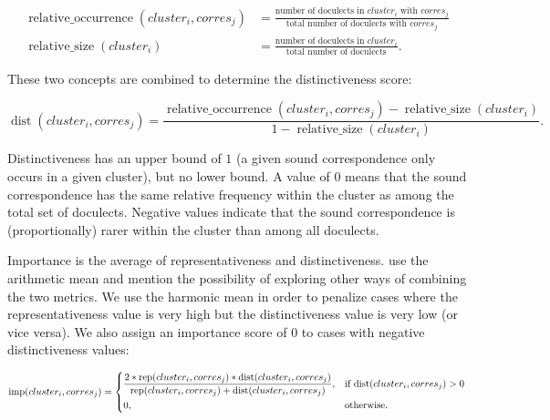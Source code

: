 \documentclass[a4paper]{article}
\begin{document}
\begin{adjustwidth}{-1cm}{-1cm}
\begin{align*}
\operatorname{relative\_occurrence}(cluster_i, corres_j) &= 
\frac{\text{number of doculects in } cluster_i \text{ with }  corres_j}
{\text{total number of doculects with } corres_j}\\
\operatorname{relative\_size}(cluster_i) &= 
\frac{\text{number of doculects in } cluster_i}
{\text{total number of doculects}}
.
\end{align*}
\end{adjustwidth}

These two concepts are combined to determine the distinctiveness score:

\begin{adjustwidth}{-1cm}{-1cm}
\begin{equation*}
\operatorname{dist}(cluster_i, corres_j) = 
\frac{\operatorname{relative\_occurrence}(cluster_i, corres_j) - \operatorname{relative\_size}(cluster_i)}
{1 - \operatorname{relative\_size}(cluster_i)}
.
\end{equation*}
\end{adjustwidth}

Distinctiveness has an upper bound of
$1$ (a given sound correspondence only occurs in a given cluster),
but no lower bound.
A value of $0$ means that the sound correspondence
has the same relative frequency within the cluster
as among the total set of doculects.
Negative values indicate that the sound correspondence
is (proportionally) rarer within the cluster
than among all doculects.

Importance is the average of representativeness and distinctiveness.
\citet{wieling2011bipartite} use the arithmetic mean
and mention the possibility of exploring
other ways of combining the two metrics.
We use the harmonic mean in order to penalize cases
where the representativeness value is very high
but the distinctiveness value is very low (or vice versa).
We also assign an importance score of $0$ to
cases with negative distinctiveness values:

\begin{adjustwidth}{-3cm}{-3cm}
\begin{equation*}
\operatorname{imp}(cluster_i, corres_j) = 
\begin{dcases}
\frac{
2 * \operatorname{rep}(cluster_i, corres_j) * \operatorname{dist}(cluster_i, corres_j)}
{\operatorname{rep}(cluster_i, corres_j) + \operatorname{dist}(cluster_i, corres_j)}, & \text{if dist}(cluster_i, corres_j) > 0\\
0, & \text{otherwise}.
\end{dcases}
\end{equation*}
\end{adjustwidth}
\end{document}
